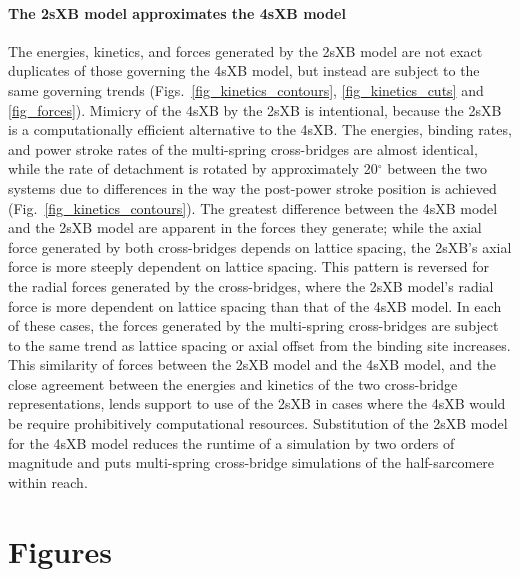 \documentclass[]{article}
\begin{document}
\paragraph*{The 2sXB model approximates the 4sXB model} %
The energies, kinetics, and forces generated by the 2sXB model are not exact duplicates of those governing the 4sXB model, but instead are subject to the same governing trends (Figs.~\ref{fig_kinetics_contours}, \ref{fig_kinetics_cuts} and \ref{fig_forces}). 
Mimicry of the 4sXB by the 2sXB is intentional, because the 2sXB is a computationally efficient alternative to the 4sXB\@.  
The energies, binding rates, and power stroke rates of the multi-spring cross-bridges are almost identical, while the rate of detachment is rotated by approximately 20$^\circ$ between the two systems due to differences in the way the post-power stroke position is achieved (Fig.~\ref{fig_kinetics_contours}).
The greatest difference between the 4sXB model and the 2sXB model are apparent in the forces they generate; while the axial force generated by both cross-bridges depends on lattice spacing, the 2sXB's axial force is more steeply dependent on lattice spacing. 
This pattern is reversed for the radial forces generated by the cross-bridges, where the 2sXB model's radial force is more dependent on lattice spacing than that of the 4sXB model.  
In each of these cases, the forces generated by the multi-spring cross-bridges are subject to the same trend as lattice spacing or axial offset from the binding site increases.
This similarity of forces between the 2sXB model and the 4sXB model, and the close agreement between the energies and kinetics of the two cross-bridge representations, lends support to use of the 2sXB in cases where the 4sXB would be require prohibitively computational resources.
Substitution of the 2sXB model for the 4sXB model reduces the runtime of a simulation by two orders of magnitude and puts multi-spring cross-bridge simulations of the half-sarcomere within reach.



\clearpage
\section*{Figures} %
\end{document}
